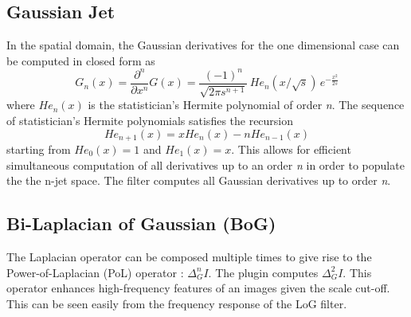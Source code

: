 \documentclass{amsart}
\begin{document}
\subsection{Gaussian Jet}\label{sec:gjet}
In the spatial domain, the  Gaussian derivatives for the one dimensional case can be  computed in closed form as
\[
G_n \left(x \right) = \frac{\partial^n}{\partial x^n} G \left(x \right) = \frac{(-1)^n} {\sqrt{ 2 \pi s^{n+1}}}  \,{He}_{n}\left(  {x}/{\sqrt{s}}\right) \,
e^{-\frac{x^2}{2s}}  
\]
where $He_n (x)$ is the statistician's Hermite polynomial of order \textit{n}.
The sequence of statistician's Hermite polynomials satisfies the recursion
\[
He_{n+1} (x) =x He_{n} (x) - n He_{n-1} (x)    
\]
starting from  $He_0 (x) = 1$ and $He_1 (x) = x$. 
This allows for efficient simultaneous computation of all derivatives up to an order \textit{n} in order to populate the the n-jet space.
The filter computes all Gaussian derivatives up to order \textit{n}.

\subsection{Bi-Laplacian of Gaussian (BoG)}
The Laplacian operator can be composed multiple times to give rise to the Power-of-Laplacian (PoL) operator \cite{Prodanov2015}:
$
\Delta_G^n I 
$.
The plugin computes $\Delta_G^2 I$.
This operator enhances high-frequency features of an images given the scale cut-off. 
This can be seen easily from the frequency response of the LoG filter.



\end{document}
